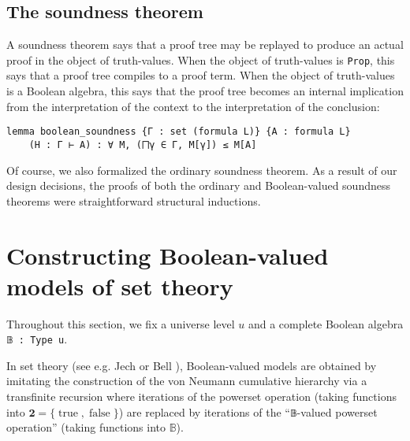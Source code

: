 \documentclass[a4paper,USenglish,cleveref, autoref]{lipics-v2019}
\newcommand{\B}{\mathbb{B}}
\newcommand{\lil}{\lstinline}
\theoremstyle{theorem}
\theoremstyle{definition}
\begin{document}
\subsection{The soundness theorem}

A soundness theorem says that a proof tree may be replayed to produce an actual proof in the object of truth-values. When the object of truth-values is \lil{Prop}, this says that a proof tree compiles to a proof term. When the object of truth-values is a Boolean algebra, this says that the proof tree becomes an internal implication from the interpretation of the context to the interpretation of the conclusion:

\begin{lstlisting}[gobble=2]
  lemma boolean_soundness {Γ : set (formula L)} {A : formula L}
    (H : Γ ⊢ A) : ∀ M, (⨅γ ∈ Γ, M[γ]) ≤ M[A]
\end{lstlisting}

Of course, we also formalized the ordinary soundness theorem. As a result of our design decisions, the proofs of both the ordinary and Boolean-valued soundness theorems were straightforward structural inductions.


\section{Constructing Boolean-valued models of set theory}
\label{sect:bvm}
Throughout this section, we fix a universe level $u$ and a complete Boolean algebra \lstinline{𝔹 : Type u}.

In set theory (see e.g. Jech \cite{jech2013set} or Bell \cite{bell2011set}), Boolean-valued models are obtained by imitating the construction of the von Neumann cumulative hierarchy via a transfinite recursion where iterations of the powerset operation (taking functions into $\mathbf{2} = \{\operatorname{true}, \operatorname{false}\}$) are replaced by iterations of the ``\lstinline{𝔹}-valued powerset operation'' (taking functions into $\B$).
\end{document}
